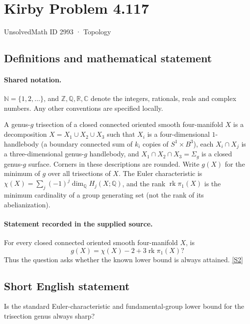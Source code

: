 \documentclass[11pt]{article}
\newcommand{\sref}[2]{\hyperlink{source:#1:#2}{[S#2]}}
\begin{document}
\setcounter{section}{2992}
\section{Kirby Problem 4.117}\label{2993}
{\small\sffamily UnsolvedMath ID 2993 · Topology}
\subsection{Definitions and mathematical statement}

\paragraph{Shared notation.}$\mathbb N=\{1,2,\ldots\}$, and $\mathbb Z,\mathbb Q,\mathbb R,\mathbb C$ denote the integers, rationals, reals and complex numbers. Any other conventions are specified locally.


A genus-$g$ trisection of a closed connected oriented smooth four-manifold $X$ is a decomposition $X=X_1\cup X_2\cup X_3$ such that $X_i$ is a four-dimensional $1$-handlebody (a boundary connected sum of $k_i$ copies of $S^1\times B^3$), each $X_i\cap X_j$ is a three-dimensional genus-$g$ handlebody, and $X_1\cap X_2\cap X_3=\Sigma_g$ is a closed genus-$g$ surface. Corners in these descriptions are rounded. Write $g(X)$ for the minimum of $g$ over all trisections of $X$. The Euler characteristic is $\chi(X)=\sum_j(-1)^j\dim_{\mathbb Q}H_j(X;\mathbb Q)$, and the rank $\operatorname{rk}\pi_1(X)$ is the minimum cardinality of a group generating set (not the rank of its abelianization).
\paragraph{Statement recorded in the supplied source.}
For every closed connected oriented smooth four-manifold $X$, is
\[
 g(X)=\chi(X)-2+3\operatorname{rk}\pi_1(X)?
\]
Thus the question asks whether the known lower bound is always attained. \sref{2993}{2}
\subsection{Short English statement}
Is the standard Euler-characteristic and fundamental-group lower bound for the trisection genus always sharp?
\end{document}
